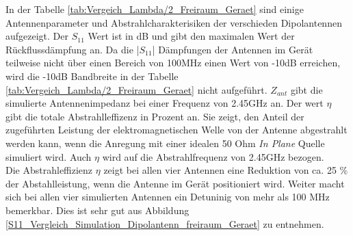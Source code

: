 In der Tabelle \ref{tab:Vergeich_Lambda/2_Freiraum_Geraet} sind einige Antennenparameter und Abstrahlcharakterisiken der verschieden Dipolantennen aufgezeigt. Der $S_{11}$ Wert ist in dB und gibt den maximalen Wert der Rückflussdämpfung an. Da die |$S_{11}$| Dämpfungen der Antennen im Gerät teilweise nicht über einen Bereich von 100MHz einen  Wert von -10dB erreichen, wird die -10dB Bandbreite in der Tabelle \ref{tab:Vergeich_Lambda/2_Freiraum_Geraet} nicht aufgeführt.
$Z_{ant}$ gibt die simulierte Antennenimpedanz bei einer Frequenz von 2.45GHz an.
Der wert $\eta$ gibt die totale Abstrahlleffizenz in Prozent an. Sie zeigt, den Anteil der zugeführten Leistung der elektromagnetischen Welle von der Antenne abgestrahlt werden kann, wenn die Anregung mit einer idealen 50 Ohm \textit{In Plane} Quelle simuliert wird. Auch $\eta$ wird auf die Abstrahlfrequenz von 2.45GHz bezogen.\\
Die Abstrahleffizienz $\eta$ zeigt bei allen vier Antennen eine Reduktion von ca. 25 $\%$ der Abstahlleistung, wenn die Antenne im Gerät positioniert wird. Weiter macht sich bei allen vier simulierten Antennen ein Detuninig von mehr als 100 MHz bemerkbar. Dies ist sehr gut aus Abbildung \ref{S11_Vergleich_Simulation_Dipolantenn_freiraum_Geraet} zu entnehmen. 



